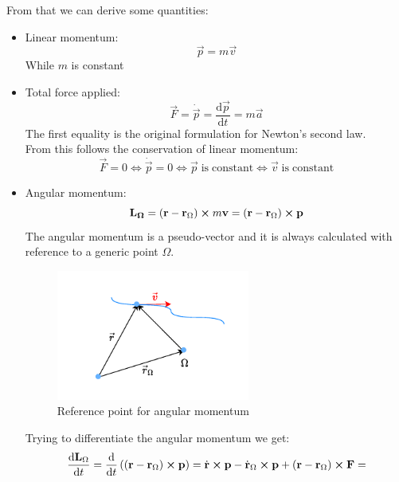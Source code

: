 From that we can derive some quantities:
\begin{itemize}
    \item Linear momentum: \begin{equation}\vec{p}=m\vec{v}\end{equation} While $m$ is constant
    \item Total force applied: \begin{equation}\vec{F}=\dot{\vec{p}}=\dfrac{\mathrm{d} \vec{p}}{\mathrm{d} t}=m\vec{a}\end{equation}The first equality is the original formulation for Newton's second law.\\From this follows the conservation of linear momentum:
    \begin{equation}\vec{F}=0 \iff\dot{\vec{p}}=0 \iff\vec{p}\;\mathrm{is\;constant} \iff\vec{v}\;\mathrm{is\;constant}\end{equation}
    \item Angular momentum:
    \begin{equation}
        \vb{L_{\Omega}} = \left(\vb{r}-\vb{r}_{\Omega}\right) \cross m\vb{v} = \left(\vb{r}-\vb{r}_{\Omega}\right) \cross \vb{p}
    \end{equation}
    The angular momentum is a pseudo-vector and it is always calculated with reference to a generic point $\Omega$.
    \begin{figure}[H]
        \centering
        \includegraphics[width=0.6\textwidth]{res/svg/omegareference.drawio}
        \caption{Reference point for angular momentum}
        \label{fig:image2}
    \end{figure}
    Trying to differentiate the angular momentum we get:
    \begin{equation}
      \begin{split}
        \dfrac{\mathrm{d}\vec{L}_{\Omega}}{\mathrm{d}t} &= \dfrac{\mathrm{d}}{\mathrm{d}t}\left(\left(\vec{r}-\vec{r}_{\Omega}\right) \cross \vec{p}\right) = \dot{\vec{r}}\cross\vec{p} - \dot{\vec{r}}_{\Omega}\cross\vec{p} + \left(\vec{r}-\vec{r}_{\Omega}\right) \cross \vec{F} = \\[8pt]

\end{split}
\end{equation}
\end{itemize}
